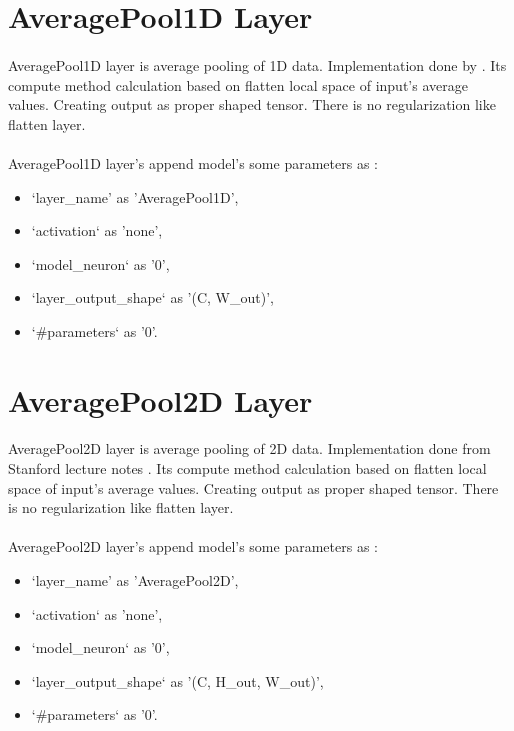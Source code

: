 \documentclass[12pt]{report}
\begin{document}
\section{AveragePool1D Layer}

\paragraph{}
AveragePool1D layer is average pooling of 1D data. Implementation done by \cite{MGK}. Its compute method calculation based on flatten local space of input's average values. Creating output as proper shaped tensor. There is no regularization like flatten layer.

\paragraph{}
AveragePool1D layer's append model's some parameters as :
\begin{itemize}
	\item `layer\_name' as 'AveragePool1D',
	\item `activation` as 'none',
	\item `model\_neuron` as '0',
	\item `layer\_output\_shape` as '(C, W\_out)',
	\item `\#parameters` as '0'.
\end{itemize}



\section{AveragePool2D Layer}

\paragraph{}
AveragePool2D layer is average pooling of 2D data. Implementation done from Stanford lecture notes \cite{cs231}. Its compute method calculation based on flatten local space of input's average values. Creating output as proper shaped tensor. There is no regularization like flatten layer.

\paragraph{}
AveragePool2D layer's append model's some parameters as :
\begin{itemize}
	\item `layer\_name' as 'AveragePool2D',
	\item `activation` as 'none',
	\item `model\_neuron` as '0',
	\item `layer\_output\_shape` as '(C, H\_out, W\_out)',
	\item `\#parameters` as '0'.
\end{itemize}
\end{document}
